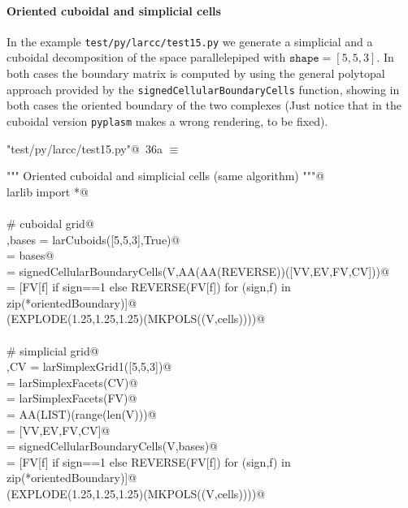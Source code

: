 \documentclass[11pt,oneside]{article}	%
\begin{document}
\paragraph{Oriented cuboidal and simplicial cells}
In the example \texttt{test/py/larcc/test15.py} we generate a simplicial and a cuboidal decomposition of the space parallelepiped with $\texttt{shape}=[5,5,3]$.
In both cases the boundary matrix is computed by using the general polytopal approach provided by the \texttt{signedCellularBoundaryCells} function, showing in both cases the oriented boundary of the two complexes
(Just notice that in the cuboidal version \texttt{pyplasm} makes a wrong rendering, to be fixed).

\begin{flushleft} \small \label{scrap57}
\protect{}\verb@"test/py/larcc/test15.py"@\nobreak\ {\footnotesize 36a }$\equiv$
\vspace{-1ex}
\begin{list}{}{} \item
\mbox{}\verb@""" Oriented cuboidal and simplicial cells (same algorithm) """@\\
\mbox{}\verb@from larlib import *@\\
\mbox{}\verb@@\\
\mbox{}\verb@# cuboidal grid@\\
\mbox{}\verb@V,bases = larCuboids([5,5,3],True)@\\
\mbox{}\verb@[VV,EV,FV,CV] = bases@\\
\mbox{}\verb@orientedBoundary = signedCellularBoundaryCells(V,AA(AA(REVERSE))([VV,EV,FV,CV]))@\\
\mbox{}\verb@cells = [FV[f] if sign==1 else REVERSE(FV[f])  for (sign,f) in zip(*orientedBoundary)]@\\
\mbox{}\verb@VIEW(EXPLODE(1.25,1.25,1.25)(MKPOLS((V,cells))))@\\
\mbox{}\verb@@\\
\mbox{}\verb@# simplicial grid@\\
\mbox{}\verb@V,CV = larSimplexGrid1([5,5,3])@\\
\mbox{}\verb@FV = larSimplexFacets(CV)@\\
\mbox{}\verb@EV = larSimplexFacets(FV)@\\
\mbox{}\verb@VV = AA(LIST)(range(len(V)))@\\
\mbox{}\verb@bases = [VV,EV,FV,CV]@\\
\mbox{}\verb@orientedBoundary = signedCellularBoundaryCells(V,bases)@\\
\mbox{}\verb@cells = [FV[f] if sign==1 else REVERSE(FV[f])  for (sign,f) in zip(*orientedBoundary)]@\\
\mbox{}\verb@VIEW(EXPLODE(1.25,1.25,1.25)(MKPOLS((V,cells))))@\\
\mbox{}\verb@@{\NWsep}
\end{list}
\vspace{-2ex}
\end{flushleft}
\end{document}
